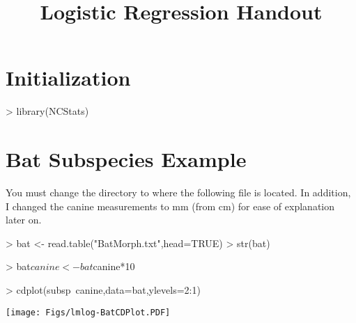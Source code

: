 \documentclass[a4paper]{article}
\begin{document}
\title{Logistic Regression Handout}
\date{}  %
\maketitle
\vspace{-72pt}


\section{Initialization} \label{sect:Inits}
\begin{Schunk}
\begin{Sinput}
> library(NCStats)
\end{Sinput}
\end{Schunk}

\section{Bat Subspecies Example}
You must change the directory to where the following file is located.  In addition, I changed the canine measurements to mm (from cm) for ease of explanation later on.
\begin{Schunk}
\begin{Sinput}
> bat <- read.table("BatMorph.txt",head=TRUE)
> str(bat)
\end{Sinput}
\begin{Sinput}
> bat$canine <- bat$canine*10
\end{Sinput}
\end{Schunk}
\begin{Schunk}
\begin{Sinput}
> cdplot(subsp~canine,data=bat,ylevels=2:1)
\end{Sinput}
\end{Schunk}
\texttt{[image: Figs/lmlog-BatCDPlot.PDF]}
\end{document}

